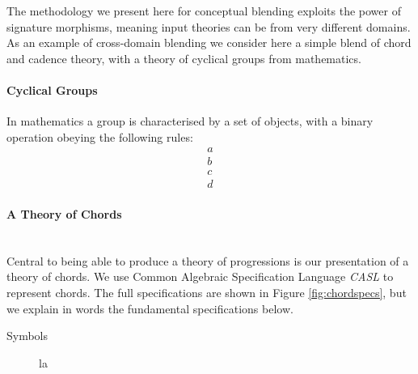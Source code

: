 \documentclass[10pt,twoside,a4paper]{article}
\begin{document}
The methodology we present here for conceptual blending exploits the
power of signature morphisms, meaning input theories can be from very
different domains. As an example of cross-domain blending we consider
here a simple blend of chord and cadence theory, with a theory of
cyclical groups from mathematics.

\paragraph{Cyclical Groups}

In mathematics a group is characterised by a set of objects, with a
binary operation obeying the following rules:
\begin{eqnarray*}
&a&\\
&b&\\
&c&\\
&d&
\end{eqnarray*}

\paragraph{A Theory of Chords}\mbox{}\\

Central to being able to produce a theory of progressions is our presentation of a theory of chords. We use Common Algebraic Specification Language {\em CASL} \cite{casl} to represent chords. The full specifications are shown in Figure \ref{fig:chordspecs}, but we explain in words the fundamental specifications below.
\begin{description}
\item[Symbols]{la}
\end{description}
\end{document}
